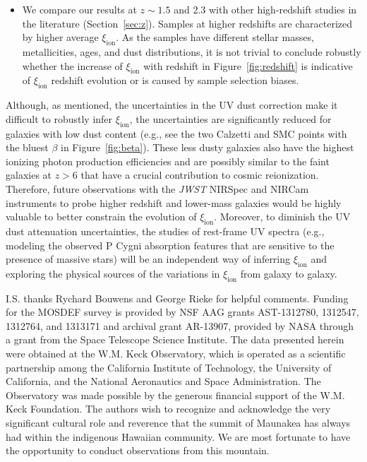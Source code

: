 \documentclass[iop]{emulateapj}
\newcommand{\xiion}{\ensuremath{\xi_{\mathrm{ion}}}}
\begin{document}
\begin{itemize}
\item We compare our results at $z\sim 1.5$ and 2.3 with other high-redshift studies in the literature (Section~\ref{sec:z}). Samples at higher redshifts are characterized by higher average {\xiion}. As the samples have different stellar masses, metallicities, ages, and dust distributions, it is not trivial to conclude robustly whether the increase of {\xiion} with redshift in Figure~\ref{fig:redshift} is indicative of {\xiion} redshift evolution or is caused by sample selection biases.

\end{itemize}

Although, as mentioned, the uncertainties in the UV dust correction make it difficult to robustly infer {\xiion}, the uncertainties are significantly reduced for galaxies with low dust content (e.g., see the two Calzetti and SMC points with the bluest $\beta$ in Figure~\ref{fig:beta}). These less dusty galaxies also have the highest ionizing photon production efficiencies and are possibly similar to the faint galaxies at $z>6$ that have a crucial contribution to cosmic reionization.
Therefore, future observations with the {\em JWST} NIRSpec and NIRCam instruments to probe higher redshift and lower-mass galaxies would be highly valuable to better constrain the evolution of {\xiion}.
Moreover, to diminish the UV dust attenuation uncertainties, the studies of rest-frame UV spectra (e.g., modeling the observed P Cygni absorption features that are sensitive to the presence of massive stars) will be an independent way of inferring {\xiion} and exploring the physical sources of the variations in {\xiion} from galaxy to galaxy.

\vspace{5mm}
I.S. thanks Rychard Bouwens and George Rieke for helpful comments.
Funding for the MOSDEF survey is provided by NSF AAG grants AST-1312780, 1312547, 1312764, and 1313171 and archival grant AR-13907, provided by NASA through a grant from the Space Telescope Science Institute.
The data presented herein were obtained at the W.M. Keck Observatory, which is operated as a scientific partnership among the California Institute of Technology, the University of California, and the National Aeronautics and Space Administration. The Observatory was made possible by the generous financial support of the W.M. Keck Foundation.
The authors wish to recognize and acknowledge the very significant cultural role and reverence that the summit of Maunakea has always had within the indigenous Hawaiian community. We are most fortunate to have the opportunity to conduct observations from this mountain.
\end{document}
